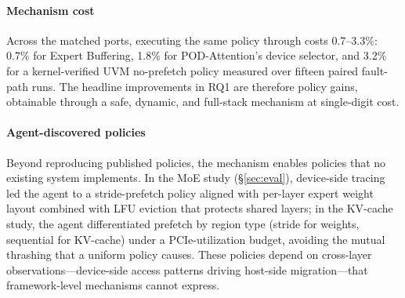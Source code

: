 \paragraph{Mechanism cost}
Across the matched ports, executing the same policy through \sys{} costs 0.7--3.3\%: 0.7\% for Expert Buffering, 1.8\% for POD-Attention's device selector, and 3.2\% for a kernel-verified UVM no-prefetch policy measured over fifteen paired fault-path runs.
The headline improvements in RQ1 are therefore policy gains, obtainable through a safe, dynamic, and full-stack mechanism at single-digit cost.

\paragraph{Agent-discovered policies}
Beyond reproducing published policies, the mechanism enables policies that no existing system implements.
In the MoE study (\S\ref{sec:eval}), device-side tracing led the agent to a stride-prefetch policy aligned with per-layer expert weight layout combined with LFU eviction that protects shared layers; in the KV-cache study, the agent differentiated prefetch by region type (stride for weights, sequential for KV-cache) under a PCIe-utilization budget, avoiding the mutual thrashing that a uniform policy causes.
These policies depend on cross-layer observations---device-side access patterns driving host-side migration---that framework-level mechanisms cannot express.
